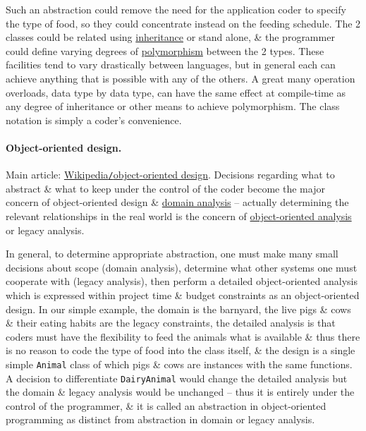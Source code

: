 \documentclass{article}
\begin{document}
Such an abstraction could remove the need for the application coder to specify the type of food, so they could concentrate instead on the feeding schedule. The 2 classes could be related using \href{https://en.wikipedia.org/wiki/Inheritance_(object-oriented_programming)}{inheritance} or stand alone, \& the programmer could define varying degrees of \href{https://en.wikipedia.org/wiki/Polymorphism_(computer_science)}{polymorphism} between the 2 types. These facilities tend to vary drastically between languages, but in general each can achieve anything that is possible with any of the others. A great many operation overloads, data type by data type, can have the same effect at compile-time as any degree of inheritance or other means to achieve polymorphism. The class notation is simply a coder's convenience.

\paragraph{Object-oriented design.} Main article: \href{https://en.wikipedia.org/wiki/Object-oriented_design}{Wikipedia{\tt/}object-oriented design}. Decisions regarding what to abstract \& what to keep under the control of the coder become the major concern of object-oriented design \& \href{https://en.wikipedia.org/wiki/Domain_analysis}{domain analysis} -- actually determining the relevant relationships in the real world is the concern of \href{https://en.wikipedia.org/wiki/Object-oriented_analysis_and_design}{object-oriented analysis} or legacy analysis.

In general, to determine appropriate abstraction, one must make many small decisions about scope (domain analysis), determine what other systems one must cooperate with (legacy analysis), then perform a detailed object-oriented analysis which is expressed within project time \& budget constraints as an object-oriented design. In our simple example, the domain is the barnyard, the live pigs \& cows \& their eating habits are the legacy constraints, the detailed analysis is that coders must have the flexibility to feed the animals what is available \& thus there is no reason to code the type of food into the class itself, \& the design is a single simple {\tt Animal} class of which pigs \& cows are instances with the same functions. A decision to differentiate {\tt DairyAnimal} would change the detailed analysis but the domain \& legacy analysis would be unchanged -- thus it is entirely under the control of the programmer, \& it is called an abstraction in object-oriented programming as distinct from abstraction in domain or legacy analysis.
\end{document}
